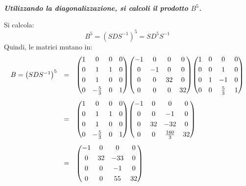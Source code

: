\documentclass[a4paper]{article}
\makeatletter
\newenvironment{rowequmat}[1]{\left(\array{@{}#1@{}}}{\endarray\right)}
\makeatother
\begin{document}
	\textcolor{Green4}{\textbf{\emph{Utilizzando la diagonalizzazione, si calcoli il prodotto $B^{5}$.}}}\newline

	\noindent
	Si calcola:
	\begin{equation*}
		B^{5} = \left(SDS^{-1}\right)^{5} = S D^{5} S^{-1}
	\end{equation*}
	Quindi, le matrici mutano in:
	\begin{equation*}
		\begin{array}{lll}
			B = \left(SDS^{-1}\right)^{5} &=&
			\begin{rowequmat}{cccc}
				1 & 0				& 0 & 0 \\ [.3em]
				0 & 1				& 1 & 0 \\ [.3em]
				0 & 1				& 0 & 0 \\ [.3em]
				0 & -\frac{5}{3}	& 0 & 1
			\end{rowequmat}
			\begin{rowequmat}{cccc}
				-1 & 0 & 0 & 0 \\ [.3em]
				0 & -1 & 0 & 0 \\ [.3em]
				0 & 0 & 32 & 0 \\ [.3em]
				0 & 0 & 0 & 32 
			\end{rowequmat}
			\begin{rowequmat}{cccc}
				1 & 0 & 0 & 0 \\ [.3em]
				0 & 0 & 1 & 0 \\ [.3em]
				0 & 1 & -1 & 0 \\ [.3em]
				0 & 0 & \frac{5}{3} & 1
			\end{rowequmat} \\[3em]
			&=&
			\begin{rowequmat}{cccc}
				1 & 0				& 0 & 0 \\ [.3em]
				0 & 1				& 1 & 0 \\ [.3em]
				0 & 1				& 0 & 0 \\ [.3em]
				0 & -\frac{5}{3}	& 0 & 1
			\end{rowequmat}
			\begin{rowequmat}{cccc}
				-1 & 0 & 0 & 0 \\ [.3em]
				0 & 0 & -1 & 0 \\ [.3em]
				0 & 32 & -32 & 0 \\ [.3em]
				0 & 0 & \frac{160}{3} & 32
			\end{rowequmat} \\[3em]
			&=&
			\begin{rowequmat}{cccc}
				-1 & 0 & 0 & 0 \\ [.3em]
				0 & 32 & -33 & 0 \\ [.3em]
				0 & 0 & -1 & 0 \\ [.3em]
				0 & 0 & 55 & 32
			\end{rowequmat}
		\end{array}
	\end{equation*}\newpage
\end{document}
